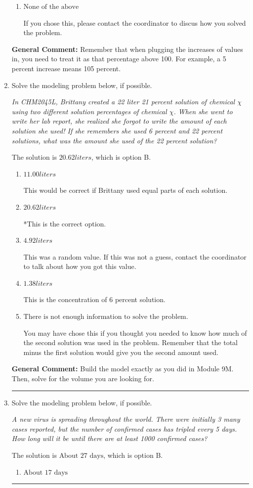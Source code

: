 \documentclass{extbook}[14pt]
\newcommand{\litem}[1]{\item #1

\rule{\textwidth}{0.4pt}}
\begin{document}
\begin{enumerate}
{\begin{enumerate}[label=\Alph*.]
* This is the correct option.
\item \( \text{None of the above} \)

If you chose this, please contact the coordinator to discus how you solved the problem.
\end{enumerate}

\textbf{General Comment:} Remember that when plugging the increases of values in, you need to treat it as that percentage above 100. For example, a 5 percent increase means 105 percent.
}
\litem{
Solve the modeling problem below, if possible.

\begin{center}
    \textit{ In CHM2045L, Brittany created a 22 liter 21 percent solution of chemical $\chi$ using two different solution percentages of chemical $\chi$. When she went to write her lab report, she realized she forgot to write the amount of each solution she used! If she remembers she used 6 percent and 22 percent solutions, what was the amount she used of the 22 percent solution? }
\end{center}
The solution is \( 20.62 liters \), which is option B.\begin{enumerate}[label=\Alph*.]
\item \( 11.00 liters \)

This would be correct if Brittany used equal parts of each solution.
\item \( 20.62 liters \)

*This is the correct option.
\item \( 4.92 liters \)

This was a random value. If this was not a guess, contact the coordinator to talk about how you got this value.
\item \( 1.38 liters \)

This is the concentration of 6 percent solution.
\item \( \text{There is not enough information to solve the problem.} \)

You may have chose this if you thought you needed to know how much of the second solution was used in the problem. Remember that the total minus the first solution would give you the second amount used.
\end{enumerate}

\textbf{General Comment:} Build the model exactly as you did in Module 9M. Then, solve for the volume you are looking for.
}
\litem{
Solve the modeling problem below, if possible.

\begin{center}
    \textit{ A new virus is spreading throughout the world. There were initially 3 many cases reported, but the number of confirmed cases has tripled every 5 days. How long will it be until there are at least 1000 confirmed cases? }
\end{center}
The solution is \( \text{About } 27 \text{ days} \), which is option B.\begin{enumerate}[label=\Alph*.]
\item \( \text{About } 17 \text{ days} \)


\end{enumerate}}
\end{enumerate}
\end{document}
